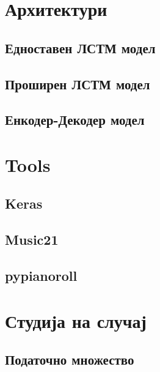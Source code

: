 \chapter{Архитектури}

\section{Едноставен ЛСТМ модел}

\section{Проширен ЛСТМ модел}

\section{Енкодер-Декодер модел}

\chapter{Tools}

\section{Keras}

\section{Music21}

\section{pypianoroll}

\chapter{Студија на случај}

\section{Податочно множество}

